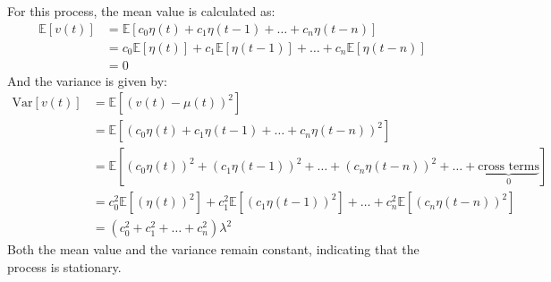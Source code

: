 For this process, the mean value is calculated as:
\begin{align*}
    \mathbb{E}\left[v(t)\right] &= \mathbb{E}\left[c_0\eta(t) + c_1\eta(t-1) + \dots + c_n\eta(t-n)\right] \\
                                &= c_0\mathbb{E}\left[\eta(t)\right] + c_1\mathbb{E}\left[\eta(t-1)\right] + \dots + c_n\mathbb{E}\left[\eta(t-n)\right] \\
                                &= 0
\end{align*}
And the variance is given by:
\begin{align*}
    \text{Var}\left[v(t)\right] &= \mathbb{E}\left[\left(v(t)-\mu(t)\right)^2\right] \\
                                &= \mathbb{E}\left[\left( c_0\eta(t) + c_1\eta(t-1) + \dots + c_n\eta(t-n) \right)^2\right] \\
                                &= \mathbb{E}\left[\left( c_0\eta(t) \right)^2 + \left(c_1\eta(t-1) \right)^2 + \dots + \left(c_n\eta(t-n) \right)^2 + \dots + \underbrace{\text{cross terms}}_0  \right] \\
                                &= c_0^2\mathbb{E}\left[\left(\eta(t)\right)^2\right] + c_1^2\mathbb{E}\left[\left(c_1\eta(t-1) \right)^2\right] + \dots + c_n^2\mathbb{E}\left[\left(c_n\eta(t-n) \right)^2\right] \\        
                                &= \left(c_0^2 + c_1^2 + \dots + c_n^2\right)\lambda^2                        
\end{align*}
Both the mean value and the variance remain constant, indicating that the process is stationary.

